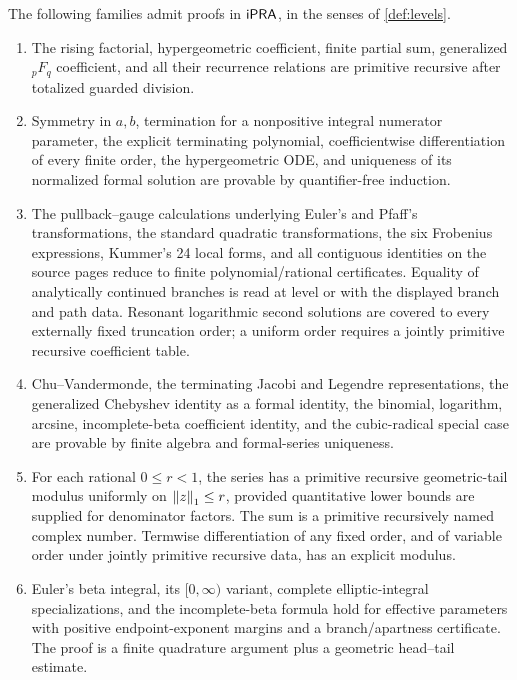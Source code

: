 \begin{theorem}\label{thm:main-package}
The following families admit proofs in \(\mathsf{iPRA}\), in the senses of
\cref{def:levels}.

\begin{enumerate}[label=(\roman*)]
\item[\StatusA--1.] The rising factorial, hypergeometric coefficient, finite
partial sum, generalized \({}_pF_q\) coefficient, and all their recurrence
relations are primitive recursive after totalized guarded division.

\item[\StatusA--2.] Symmetry in \(a,b\), termination for a nonpositive
integral numerator parameter, the explicit terminating polynomial,
coefficientwise differentiation of every finite order, the hypergeometric
ODE, and uniqueness of its normalized formal solution are provable by
quantifier-free induction.

\item[\StatusA--3.] The pullback--gauge calculations underlying Euler's
and Pfaff's transformations, the standard quadratic transformations, the six
Frobenius expressions, Kummer's 24 local forms, and all contiguous identities
on the source pages reduce to finite polynomial/rational certificates.
Equality of analytically continued branches is read at level \StatusB{} or
\StatusC{} with the displayed branch and path data.  Resonant logarithmic
second solutions are covered to every externally fixed truncation order; a
uniform order requires a jointly primitive recursive coefficient table.

\item[\StatusA--4.] Chu--Vandermonde, the terminating Jacobi and Legendre
representations, the generalized Chebyshev identity as a formal identity, the
binomial, logarithm, arcsine, incomplete-beta coefficient identity, and the
cubic-radical special case are provable by finite algebra and formal-series
uniqueness.

\item[\StatusB--1.] For each rational \(0\le r<1\), the series has a primitive
recursive geometric-tail modulus uniformly on \(\left\lVert z\right\rVert_1\le r\), provided
quantitative lower bounds are supplied for denominator factors.  The sum is a
primitive recursively named complex number.  Termwise differentiation of any
fixed order, and of variable order under jointly primitive recursive data,
has an explicit modulus.

\item[\StatusB--2.] Euler's beta integral, its \([0,\infty)\) variant,
complete elliptic-integral specializations, and the incomplete-beta formula
hold for effective parameters with positive endpoint-exponent margins and a
branch/apartness certificate.  The proof is a finite quadrature argument plus
a geometric head--tail estimate.


\end{enumerate}
\end{theorem}
